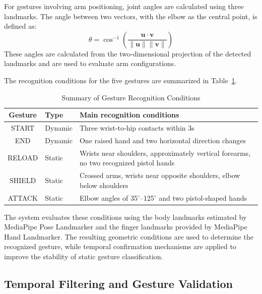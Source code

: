\documentclass[lettersize,journal]{IEEEtran}
\begin{document}
	For gestures involving arm positioning, joint angles are calculated using three landmarks. The angle between two vectors, with the elbow as the central point, is defined as:
	\begin{equation}
		\theta = \cos^{-1}\left( \frac{\mathbf{u} \cdot \mathbf{v}}{\|\mathbf{u}\| \|\mathbf{v}\|} \right)
	\end{equation}
	These angles are calculated from the two-dimensional projection of the detected landmarks and are used to evaluate arm configurations.
	
	The recognition conditions for the five gestures are summarized in Table~\ref{tab:gesture_conditions}.

	\begin{table}[!t]
		\centering
		\caption{Summary of Gesture Recognition Conditions}
		\label{tab:gesture_conditions}
		\vspace{0.5em}
		\begin{tabularx}{\columnwidth}{@{}c l X@{}}
			\toprule
			\textbf{Gesture} & \textbf{Type} & \textbf{Main recognition conditions} \\
			\midrule
			START & Dynamic & Three wrist-to-hip contacts within 3s \\
			END & Dynamic & One raised hand and two horizontal direction changes \\
			RELOAD & Static & Wrists near shoulders, approximately vertical forearms, no two recognized pistol hands \\
			SHIELD & Static & Crossed arms, wrists near opposite shoulders, elbow below shoulders \\
			ATTACK & Static & Elbow angles of 35$^\circ$--125$^\circ$ and two pistol-shaped hands \\
			\bottomrule
		\end{tabularx}
	\end{table}
	
	The system evaluates these conditions using the body landmarks estimated by MediaPipe Pose Landmarker and the finger landmarks provided by MediaPipe Hand Landmarker. The resulting geometric conditions are used to determine the recognized gesture, while temporal confirmation mechanisms are applied to improve the stability of static gesture classification.
	
	\subsection{Temporal Filtering and Gesture Validation}
	
\end{document}
